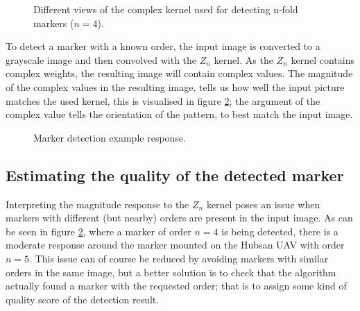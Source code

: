 \documentclass{article}
\begin{document}
\begin{figure}
\centering
{}
\hspace{.05\textwidth}%
\hspace{.05\textwidth}%
\hspace{.05\textwidth}%
\caption{Different views of the complex kernel used for detecting n-fold markers ($n = 4$).}
\label{figKernelToDetectPlainMarker}
\end{figure}
To detect a marker with a known order, the input image is converted to a grayscale image and then convolved with the $Z_n$ kernel.
As the $Z_n$ kernel contains complex weights, the resulting image will contain complex values.
The magnitude of the complex values in the resulting image, tells us how well the
input picture matches the used kernel, this is visualised in figure \ref{figDetectionExample};
the argument of the complex value tells the orientation of the
pattern, to best match the input image.
\begin{figure}
\centering
{}
\hfill%
\caption{Marker detection example response.}
\label{figDetectionExample}
\end{figure}


\subsection{Estimating the quality of the detected marker}
Interpreting the magnitude response to the $Z_n$ kernel poses an issue
when markers with different (but nearby) orders are present in the input image.
As can be seen in figure \ref{figDetectionExample}, where a marker of order $n = 4$
is being detected, there is a moderate response around the marker mounted on the Hubsan UAV with order $n = 5$.
This issue can of course be reduced by avoiding markers with similar orders in the same image, but
a better solution is to check that the algorithm actually found a marker with the requested order; that
is to assign some kind of quality score of the detection result.
\end{document}
